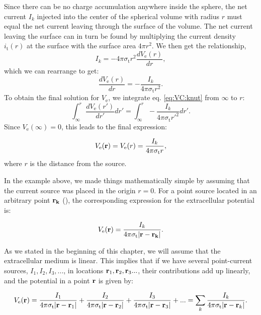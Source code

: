 Since there can be no charge accumulation anywhere inside the sphere, 
the net current $I_k$ injected into the center of the spherical volume with radius $r$ 
must equal the net current leaving through the surface of the volume. 
The net current leaving the surface can in turn be found by multiplying 
the current density $i_\mathrm{t}(r)$ at the surface with the surface area $4\pi r^2$. 
We then get the relationship, 
\begin{equation}
I_k = -4\pi \sigma_\mathrm{t} r^2  \frac{dV_\mathrm{e}(r)}{dr}, 
\end{equation}
which we can rearrange to get:
\begin{equation}
\frac{dV_\mathrm{e}(r)}{dr} = -\frac{I_k}{4\pi \sigma_\mathrm{t} r^2 }.
\label{eq:VC:knut}
\end{equation}
To obtain the final solution for $V_\mathrm{e}$, we integrate eq. \ref{eq:VC:knut} from $\infty$ to $r$:
\begin{equation}
\int_{\infty}^r \frac{dV_\mathrm{e}(r')}{dr'} dr' = \int_{\infty}^r -\frac{I_k}{4\pi \sigma_\mathrm{t} r'^2 } dr'.
\label{eq:VC:knut2}
\end{equation}
Since $V_\mathrm{e}({\infty}) = 0$, this leads to the final expression:

\begin{equation}
V_\mathrm{e}({\bf r}) = V_\mathrm{e}(r) = \frac{I_k}{4\pi \sigma_\mathrm{t} r},
\label{eq:VC:pointsource}
\end{equation}
where $r$ is the distance from the source.

In the example above, we made things mathematically simple by assuming 
that the current source was placed in the origin $r = 0$.
For a point source located in an arbitrary point ${\bf r_k} $ (), 
the corresponding expression for the extracellular potential is:

\begin{equation}
V_\mathrm{e}({\bf r}) = \frac{I_k}{4\pi \sigma_\mathrm{t} |{\bf r-r_k}|}.
\label{eq:VC:pointsource2}
\end{equation}

As we stated in the beginning of this chapter, we will assume that the extracellular medium is linear.
This implies that if we have several point-current sources, $I_{1}, I_2, I_3, ... $, 
in locations ${\bf r}_1, {\bf r}_2, {\bf r}_3 ... $, 
their contributions add up linearly, and the potential in a point ${\bf r}$ is given by:

\begin{equation}
V_\mathrm{e}({\bf r}) = \frac{I_1}{4\pi  \sigma_\mathrm{t} |{\bf r}-{\bf r}_1| } + \frac{I_2}{4\pi  \sigma_\mathrm{t}  |{\bf r}-{\bf r}_2| } + \frac{I_3}{4\pi  \sigma_\mathrm{t}  |{\bf r}-{\bf r}_3|} + ... = \sum_k \frac{I_k}{4\pi  \sigma_\mathrm{t} |{\bf r}-{\bf r}_k| }.
\label{eq:VC:pointsources}
\end{equation}

